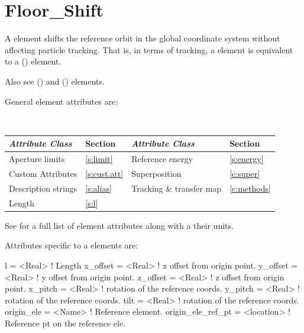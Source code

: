 \section{Floor_Shift}
\label{s:floor.ele}

A  element shifts the reference orbit in the global coordinate system without
affecting particle tracking. That is, in terms of tracking, a  element is equivalent
to a  () element. 

Also see  () and  () elements.

General  element attributes are:
\begin{center}
\tt
\begin{tabular}{llll} \toprule
  {\sl Attribute Class}      & Section           & {\sl Attribute Class}      & Section         \\ \midrule
  Aperture limits            & \ref{s:limit}     & Reference energy           & \ref{s:energy}  \\
  Custom Attributes          & \ref{s:cust.att}  & Superposition              & \ref{c:super}   \\
  Description strings        & \ref{s:alias}     & Tracking \& transfer map   & \ref{c:methods} \\
  Length                     & \ref{s:l}         &                            &                 \\
  \bottomrule
\end{tabular}
\end{center}
\toffset
See  for a full list of element attributes along with a their units.

Attributes specific to a  elements are:
\begin{example}
  l                 = <Real>     ! Length
  x_offset          = <Real>     ! x offset from origin point.
  y_offset          = <Real>     ! y offset from origin point.
  z_offset          = <Real>     ! z offset from origin point.
  x_pitch           = <Real>     ! rotation of the reference coords.
  y_pitch           = <Real>     ! rotation of the reference coords.
  tilt              = <Real>     ! rotation of the reference coords.
  origin_ele        = <Name>     ! Reference element.
  origin_ele_ref_pt = <location> ! Reference pt on the reference ele.
\end{example}

